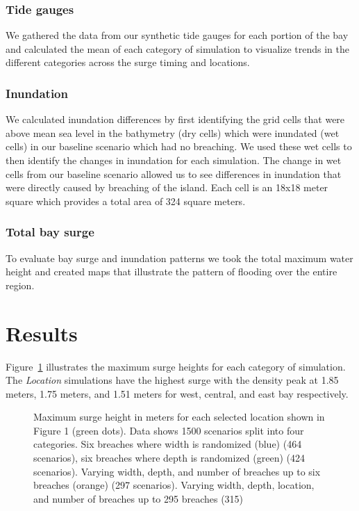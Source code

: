 \documentclass{coastal_paper}
\begin{document}
\subsubsection{Tide gauges}
We gathered the data from our synthetic tide gauges for each portion of the bay and calculated the mean of each category of simulation to visualize trends in the different categories across the surge timing and locations.
\subsubsection{Inundation}
We calculated inundation differences by first identifying the grid cells that were above mean sea level in the bathymetry (dry cells) which were inundated  (wet cells) in our baseline scenario which had no breaching. We used these wet cells to then identify the changes in inundation for each simulation. The change in wet cells from our baseline scenario allowed us to see differences in inundation that were directly caused by breaching of the island. Each cell is an 18x18 meter square which provides a total area of 324 square meters. 

\subsubsection{Total bay surge}
To evaluate bay surge and inundation patterns we took the total maximum water height and created maps that illustrate the pattern of flooding over the entire region.


\section{Results}
 Figure~\ref{fig:3} illustrates the maximum surge heights for each category of simulation. The \emph{Location} simulations have the highest surge with the density peak at 1.85 meters, 1.75 meters, and 1.51 meters for west, central, and east bay respectively. 

\begin{figure}[ht]
    \centering
    \resizebox{\textwidth}{!}{%
            
        }
    \caption{Maximum surge height in meters for each selected location shown in Figure 1 (green dots). Data shows 1500 scenarios split into four categories. Six breaches where width is randomized (blue) (464 scenarios), six breaches where depth is randomized (green) (424 scenarios). Varying width, depth, and number of breaches up to six breaches (orange) (297 scenarios). Varying width, depth, location, and number of breaches up to 295 breaches (315)}
    \label{fig:3}
\end{figure}
\end{document}

